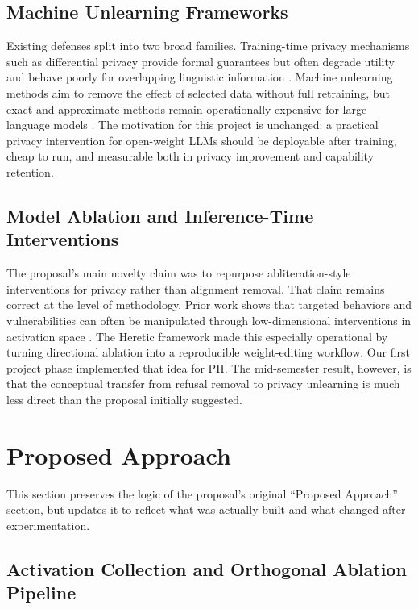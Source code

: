 \documentclass[11pt]{article}
\begin{document}
\subsection{Machine Unlearning Frameworks}

Existing defenses split into two broad families. Training-time privacy mechanisms such as differential privacy provide formal guarantees but often degrade utility and behave poorly for overlapping linguistic information \citep{abadi2016deep, bagdasaryan2019differential}. Machine unlearning methods aim to remove the effect of selected data without full retraining, but exact and approximate methods remain operationally expensive for large language models \citep{bourtoule2021machine, golatkar2020eternal, tarun2023fast}. The motivation for this project is unchanged: a practical privacy intervention for open-weight LLMs should be deployable after training, cheap to run, and measurable both in privacy improvement and capability retention.

\subsection{Model Ablation and Inference-Time Interventions}

The proposal's main novelty claim was to repurpose abliteration-style interventions for privacy rather than alignment removal. That claim remains correct at the level of methodology. Prior work shows that targeted behaviors and vulnerabilities can often be manipulated through low-dimensional interventions in activation space \citep{zhao2024facilitating, arditi2024refusal, labonne2024uncensor, agnihotri2025granular}. The Heretic framework \citep{heretic2025} made this especially operational by turning directional ablation into a reproducible weight-editing workflow. Our first project phase implemented that idea for PII. The mid-semester result, however, is that the conceptual transfer from refusal removal to privacy unlearning is much less direct than the proposal initially suggested.

\section{Proposed Approach}

This section preserves the logic of the proposal's original ``Proposed Approach'' section, but updates it to reflect what was actually built and what changed after experimentation.

\subsection{Activation Collection and Orthogonal Ablation Pipeline}
\end{document}
